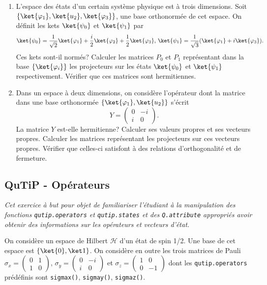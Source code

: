 \begin{enumerate}
\item L'espace des états d'un certain système physique est à trois dimensions.
Soit $\{\ket{\varphi_1}, \ket{u_{2}}, \ket{\varphi_3}\}$, une base
orthonormée de cet espace. On définit les kets $\ket{\psi_{0}}$ et
$\ket{\psi_1}$ par
\begin{equation}
\ket{\psi_{0}}=\frac{1}{\sqrt{2}}\ket{\varphi_1}+\frac{i}{2}\ket{\varphi_{2}}
+\frac{1}{2}\ket{\varphi_3} \text{, }\ket{\psi_1}=\frac{1}{\sqrt{3}}(
\ket{\varphi_1}+i\ket{\varphi_3}).
\end{equation}
Ces kets sont-il normés? Calculer les matrices $P_{0}$ et $P_1$ représentant
dans la base $\{\ket{\varphi_{i}}\}$ les projecteurs sur les états
$\ket{\psi_{0}}$ et $\ket{\psi_1}$ respectivement. Vérifier que ces matrices
sont hermitiennes.

\item Dans un espace à deux dimensions, on considère l'opérateur dont la
matrice dans une base orthonormée $\{\ket{\varphi_1},\ket{u_{2}}\}$ s'écrit
\begin{equation}
Y=\begin{pmatrix}
0 & -i\\
i & 0
\end{pmatrix}.
\end{equation}
La matrice $Y$ est-elle hermitienne? Calculer ses valeurs propres et ses
vecteurs propres. Calculer les matrices représentant les projecteurs sur ces
vecteurs propres. Vérifier que celles-ci satisfont à des relations
d'orthogonalité et de fermeture.

\end{enumerate}

\subsection{QuTiP - Opérateurs}

\emph{Cet exercice à but pour objet de familiariser l'étudiant à la manipulation 
des fonctions \texttt{qutip.operators} et \texttt{qutip.states} et des 
\texttt{Q.attribute} appropriés avoir obtenir des informations sur les 
opérateurs et vecteurs d'état.}

On considère un espace de Hilbert $\mathcal{H}$ d'un état de spin 1/2. Une base
de cet espace est $\{\ket{0},\ket1\}$. On considère en outre les trois matrices
de Pauli $\sigma_x = \begin{pmatrix}0 & 1 \\ 1 & 0 \end{pmatrix}$, $\sigma_y =
\begin{pmatrix}0 & -i \\ i & 0 \end{pmatrix}$ et
$\sigma_z = \begin{pmatrix}1 & 0 \\ 0 & -1 \end{pmatrix}$ dont les 
\texttt{qutip.operators} prédéfinis sont \texttt{sigmax()}, \texttt{sigmay()}, 
\texttt{sigmaz()}.

